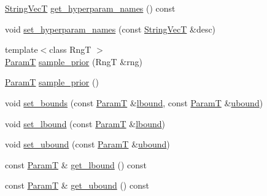 \begin{DoxyCompactItemize}
\hyperlink{namespacemappel_aae88cf18bccfbb789a6019bcfbbfca68}{String\+VecT} \hyperlink{classmappel_1_1PointEmitterModel_a1b8bbd4bdddfb8f5236e8e50fe546c36}{get\+\_\+hyperparam\+\_\+names} () const 
\item 
void \hyperlink{classmappel_1_1PointEmitterModel_a6cdba258bda50cff162dc16a49383bb0}{set\+\_\+hyperparam\+\_\+names} (const \hyperlink{namespacemappel_aae88cf18bccfbb789a6019bcfbbfca68}{String\+VecT} \&desc)
\item 
{\footnotesize template$<$class RngT $>$ }\\\hyperlink{classmappel_1_1PointEmitterModel_a665ec6aea3aac139bb69a23c06d4b9a1}{ParamT} \hyperlink{classmappel_1_1PointEmitterModel_a031ef6c978371ce3774dffe811060842}{sample\+\_\+prior} (RngT \&rng)
\item 
\hyperlink{classmappel_1_1PointEmitterModel_a665ec6aea3aac139bb69a23c06d4b9a1}{ParamT} \hyperlink{classmappel_1_1PointEmitterModel_a481a8021b13918c01f7ff5b657418227}{sample\+\_\+prior} ()
\item 
void \hyperlink{classmappel_1_1PointEmitterModel_a31f139d9eb58f210f3359a9f5be9dd15}{set\+\_\+bounds} (const \hyperlink{classmappel_1_1PointEmitterModel_a665ec6aea3aac139bb69a23c06d4b9a1}{ParamT} \&\hyperlink{classmappel_1_1PointEmitterModel_a889bc82f74cfa654da121e5770296ab2}{lbound}, const \hyperlink{classmappel_1_1PointEmitterModel_a665ec6aea3aac139bb69a23c06d4b9a1}{ParamT} \&\hyperlink{classmappel_1_1PointEmitterModel_a35b883e84b6a2e0093bdf482c623beef}{ubound})
\item 
void \hyperlink{classmappel_1_1PointEmitterModel_a737fa5857415b9830fa2e5ccdff48541}{set\+\_\+lbound} (const \hyperlink{classmappel_1_1PointEmitterModel_a665ec6aea3aac139bb69a23c06d4b9a1}{ParamT} \&\hyperlink{classmappel_1_1PointEmitterModel_a889bc82f74cfa654da121e5770296ab2}{lbound})
\item 
void \hyperlink{classmappel_1_1PointEmitterModel_a7363961cc405e585b39e81a7ad85c8d6}{set\+\_\+ubound} (const \hyperlink{classmappel_1_1PointEmitterModel_a665ec6aea3aac139bb69a23c06d4b9a1}{ParamT} \&\hyperlink{classmappel_1_1PointEmitterModel_a35b883e84b6a2e0093bdf482c623beef}{ubound})
\item 
const \hyperlink{classmappel_1_1PointEmitterModel_a665ec6aea3aac139bb69a23c06d4b9a1}{ParamT} \& \hyperlink{classmappel_1_1PointEmitterModel_aeb486e8f6f6fa694e3746e84eebcf848}{get\+\_\+lbound} () const 
\item 
const \hyperlink{classmappel_1_1PointEmitterModel_a665ec6aea3aac139bb69a23c06d4b9a1}{ParamT} \& \hyperlink{classmappel_1_1PointEmitterModel_a0dfb473c48d177a4540d328abb03cd55}{get\+\_\+ubound} () const 

\end{DoxyCompactItemize}
